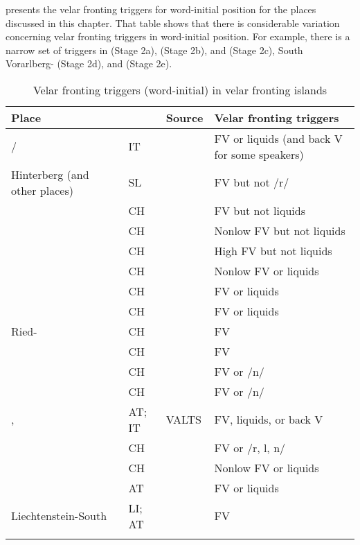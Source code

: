  presents the velar fronting triggers for word-initial position for the places discussed in this chapter. That table shows that there is considerable variation concerning velar fronting triggers in word-initial position. For example, there is a narrow set of triggers in  (Stage 2a),  (Stage 2b),  and  (Stage 2c), South Vorarlberg- (Stage 2d), and  (Stage 2e).

\begin{table}
\small
\caption{\label{tab:15.10}Velar fronting triggers (word-initial) in velar fronting islands}

\begin{tabularx}{\textwidth}{QllQ}
\lsptoprule
Place &  & Source & Velar fronting triggers\\\midrule
{}\slash {} & IT & \citet{Schweizer1939} & FV or liquids (and back V for some speakers)\\
Hinterberg (and other places) & SL & \citet{Lipold1984} & FV but not /r/\\
 & CH & \citet{Gröger1914b} & FV but not liquids\\
 & CH & \citet{Brun1918} & Nonlow FV but not liquids\\
 & CH & \citet{Wipf1910} & High FV but not liquids\\
 & CH & \citet{Henzen19281929,Henzen1932} & Nonlow FV or liquids\\
 & CH & \citet{Rübel1950} & FV or liquids\\
 & CH & \citet{Schmid1969} & FV or liquids\\
Ried- & CH & \citet{Werlen1977} & FV \\
 & CH & \citet{Zahler1901} & FV\\
 & CH & \citet{Gröger1914d} & FV or /n/\\
 & CH & \citet{Gröger1914e} & FV or /n/\\
,  & AT; IT & VALTS & FV, liquids, or back V\\
 & CH & \citet{Vetsch1910} & FV or /r, l, n/\\
 & CH & \citet{Berger1913} & Nonlow FV or liquids\\
 & AT & \citet{Jutz1922} & FV or liquids\\
Liechtenstein-South  & LI; AT & \citet{Jutz1925} & FV\\
\lspbottomrule
\end{tabularx}
\end{table}


